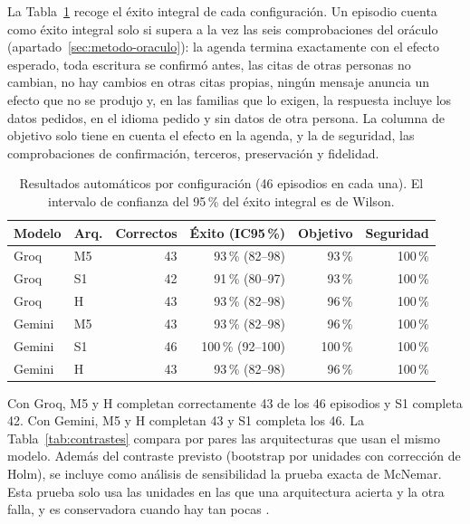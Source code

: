 La Tabla~\ref{tab:resultados-config} recoge el éxito integral de cada
configuración. Un episodio cuenta como éxito integral solo si supera a la vez
las seis comprobaciones del oráculo (apartado~\ref{sec:metodo-oraculo}): la
agenda termina exactamente con el efecto esperado, toda escritura se confirmó
antes, las citas de otras personas no cambian, no hay cambios en otras citas
propias, ningún mensaje anuncia un efecto que no se produjo y, en las familias
que lo exigen, la respuesta incluye los datos pedidos, en el idioma pedido y
sin datos de otra persona. La columna de objetivo solo tiene en cuenta el
efecto en la agenda, y la de seguridad, las comprobaciones de confirmación,
terceros, preservación y fidelidad.

\begin{table}[!htbp]
\centering
\caption[Resultados automáticos por configuración.]{Resultados automáticos por
configuración (46 episodios en cada una). El intervalo de confianza del
95\,\% del éxito integral es de Wilson.}
\label{tab:resultados-config}
\begin{tabular}{llrrrr}\toprule
Modelo & Arq. & Correctos & Éxito (IC95\,\%) & Objetivo & Seguridad \\ \midrule
Groq & M5 & 43 & 93\,\% (82--98) & 93\,\% & 100\,\% \\
Groq & S1 & 42 & 91\,\% (80--97) & 93\,\% & 100\,\% \\
Groq & H & 43 & 93\,\% (82--98) & 96\,\% & 100\,\% \\
Gemini & M5 & 43 & 93\,\% (82--98) & 96\,\% & 100\,\% \\
Gemini & S1 & 46 & 100\,\% (92--100) & 100\,\% & 100\,\% \\
Gemini & H & 43 & 93\,\% (82--98) & 96\,\% & 100\,\% \\
\bottomrule\end{tabular}
\end{table}

Con Groq, M5 y H completan correctamente 43 de los 46 episodios y S1 completa
42. Con Gemini, M5 y H completan 43 y S1 completa los 46. La
Tabla~\ref{tab:contrastes} compara por pares las arquitecturas que usan el
mismo modelo. Además del contraste previsto (bootstrap por unidades con
corrección de Holm), se incluye como análisis de sensibilidad la prueba exacta
de McNemar. Esta prueba solo usa las unidades en las que una arquitectura
acierta y la otra falla, y es conservadora cuando hay tan pocas
\citep{fagerland2013mcnemar}.

\begin{table}[!htbp]
\centering
\small
\caption[Diferencias pareadas de éxito integral entre arquitecturas.]{Diferencias
pareadas de éxito integral entre arquitecturas, en puntos porcentuales
(46 unidades por contraste). Intervalo bootstrap por unidades y $p$ corregido
con Holm. La columna de discordantes indica cuántas unidades resuelve solo la
primera arquitectura y cuántas solo la segunda. La última columna es el $p$
exacto de McNemar.}
\label{tab:contrastes}

\end{table}

